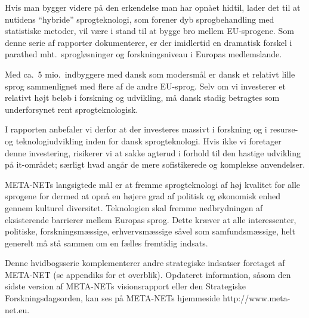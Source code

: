 \documentclass[]{../../metanetpaper}
\begin{document}
\begin{multicols}{2}
  
  
 Hvis man bygger videre \mbox{p\aa} den erkendelse man har opn\aa et hidtil, lader det til at nutidens ``hybride'' sprogteknologi, som forener dyb sprogbehandling med statistiske metoder, vil v\ae re i stand til at bygge bro mellem EU-sprogene. Som denne serie af rapporter dokumenterer, er der imidlertid en dramatisk forskel i parathed mht.\ sprogl\o sninger og forskningsniveau i Europas medlemslande.

Med ca.\ 5 mio.\ indbyggere med dansk som modersm\aa l er dansk et relativt lille sprog sammenlignet med flere af de andre EU-sprog. Selv om vi investerer et relativt h\o jt bel\o b i forskning og udvikling, \mbox{m\aa} dansk stadig betragtes som underforsynet rent sprogteknologisk. 

I rapporten anbefaler vi derfor at der investeres massivt i forskning 
og i resurse- og teknologiudvikling inden for dansk sprogteknologi.
Hvis ikke vi foretager denne investering, risikerer vi at sakke agterud i forhold til den hastige udvikling \mbox{p\aa} it-omr\aa det; s\ae rligt hvad ang\aa r de mere sofistikerede og komplekse anvendelser.

META-NETs langsigtede m\aa l er at fremme sprogteknologi af h\o j kvalitet for alle sprogene for dermed at \mbox{opn\aa} en h\o jere grad af politisk og \o konomisk enhed gennem kulturel diversitet. Teknologien skal fremme nedbrydningen af eksisterende barrierer mellem Europas sprog. Dette kr\ae ver at alle interessenter,  politiske, forskningsm\ae ssige, erhvervsm\ae ssige s\aa vel som samfundsm\ae ssige, helt generelt  \mbox{m\aa} \mbox{st\aa} sammen om en f\ae lles fremtidig indsats.

Denne hvidbogsserie komplementerer andre strategiske indsatser foretaget af META-NET (se appendiks for et overblik). Opdateret information, \mbox{s\aa}som den sidste version af META-NETs visionsrapport  \cite{Meta1} eller den Strategiske Forskningsdagsorden, kan ses \mbox{p\aa} META-NETs hjemmeside http://www.meta-net.eu.


\end{multicols}

\clearpage


\end{document}
